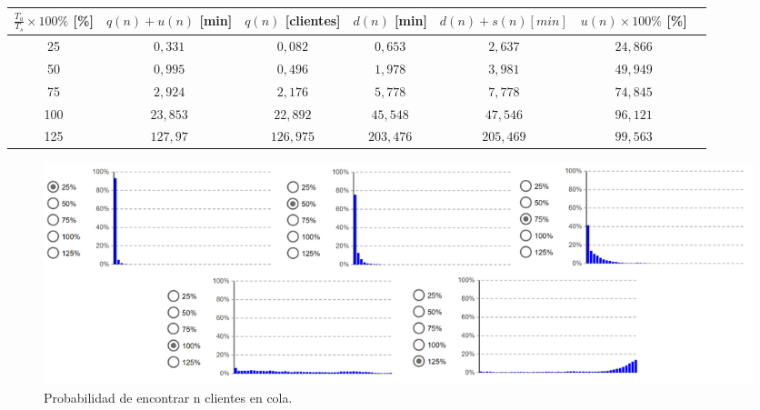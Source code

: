 \begin{tabular}{||c||c|c|c|c|c|c||}
    \hline \hline
    $\frac{T_a}{T_s}\times100\%$ [\%] & $q(n)+u(n)$ [min] & $q(n)$ [clientes] & $d(n)$ [min] & $d(n)+s(n) [min]$ & $u(n)\times100\%$ [\%]\\
    \hline \hline
    25 & $0,331$ & $0,082$ & $0,653$ & $2,637$ & $24,866$ \\
    \hline
    50 & $0,995$ & $0,496$ & $1,978$ & $3,981$ & $49,949$ \\
    \hline
    75 & $2,924$ & $2,176$ & $5,778$ & $7,778$ & $74,845$ \\
    \hline
    100 & $23,853$ & $22,892$ & $45,548$ & $47,546$ & $96,121$ \\
    \hline
    125 & $127,97$ & $126,975$ & $203,476$ & $205,469$ & $99,563$ \\
    \hline \hline
\end{tabular}

\begin{figure}[H]
  \includegraphics[width=\linewidth]{images/anylogic-colas-50}
  \caption{Probabilidad de encontrar n clientes en cola.}
\end{figure}

